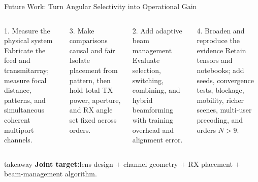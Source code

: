 \begin{frame}[t]{Future Work: Turn Angular Selectivity into Operational Gain}
\scriptsize
\begin{columns}[T,onlytextwidth]
  \begin{block}{1. Measure the physical system}
    Fabricate the feed and transmitarray; measure focal distance, patterns, and
    simultaneous coherent multiport channels.
  \end{block}
  \begin{block}{3. Make comparisons causal and fair}
    Isolate placement from pattern, then hold total TX power, aperture, and RX
    angle set fixed across orders.
  \end{block}

  \begin{block}{2. Add adaptive beam management}
    Evaluate selection, switching, combining, and hybrid beamforming with
    training overhead and alignment error.
  \end{block}
  \begin{block}{4. Broaden and reproduce the evidence}
    Retain tensors and notebooks; add seeds, convergence tests, blockage,
    mobility, richer scenes, multi-user precoding, and orders $N>9$.
  \end{block}
\end{columns}

\vspace{0.10cm}
\begin{beamercolorbox}[rounded=true,sep=0.75ex,wd=\linewidth]{takeaway}
  \centering
  \textbf{Joint target:}\quad lens design $+$ channel geometry $+$ RX placement
  $+$ beam-management algorithm.
\end{beamercolorbox}
\end{frame}
